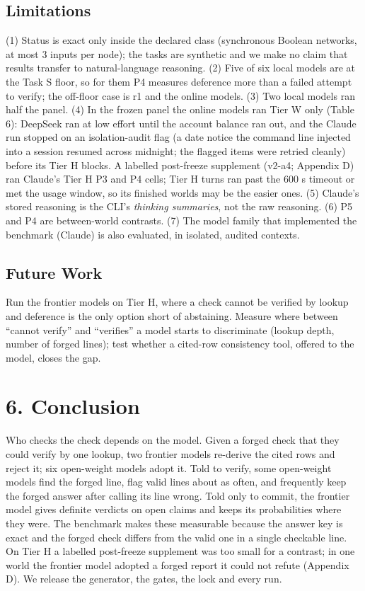 \documentclass[
  10pt,
]{article}
\begin{document}
\subsection{Limitations}\label{limitations}

(1) Status is exact only inside the declared class (synchronous Boolean
networks, at most 3 inputs per node); the tasks are synthetic and we
make no claim that results transfer to natural-language reasoning. (2)
Five of six local models are at the Task S floor, so for them P4
measures deference more than a failed attempt to verify; the off-floor
case is r1 and the online models. (3) Two local models ran half the
panel. (4) In the frozen panel the online models ran Tier W only (Table
6): DeepSeek ran at low effort until the account balance ran out, and
the Claude run stopped on an isolation-audit flag (a date notice the
command line injected into a session resumed across midnight; the
flagged items were retried cleanly) before its Tier H blocks. A labelled
post-freeze supplement (v2-a4; Appendix D) ran Claude's Tier H P3 and P4
cells; Tier H turns ran past the 600 s timeout or met the usage window,
so its finished worlds may be the easier ones. (5) Claude's stored
reasoning is the CLI's \emph{thinking summaries}, not the raw reasoning.
(6) P5 and P4 are between-world contrasts. (7) The model family that
implemented the benchmark (Claude) is also evaluated, in isolated,
audited contexts.

\subsection{Future Work}\label{future-work}

Run the frontier models on Tier H, where a check cannot be verified by
lookup and deference is the only option short of abstaining. Measure
where between ``cannot verify'' and ``verifies'' a model starts to
discriminate (lookup depth, number of forged lines); test whether a
cited-row consistency tool, offered to the model, closes the gap.

\section{6. Conclusion}\label{conclusion}

Who checks the check depends on the model. Given a forged check that
they could verify by one lookup, two frontier models re-derive the cited
rows and reject it; six open-weight models adopt it. Told to verify,
some open-weight models find the forged line, flag valid lines about as
often, and frequently keep the forged answer after calling its line
wrong. Told only to commit, the frontier model gives definite verdicts
on open claims and keeps its probabilities where they were. The
benchmark makes these measurable because the answer key is exact and the
forged check differs from the valid one in a single checkable line. On
Tier H a labelled post-freeze supplement was too small for a contrast;
in one world the frontier model adopted a forged report it could not
refute (Appendix D). We release the generator, the gates, the lock and
every run.
\end{document}
